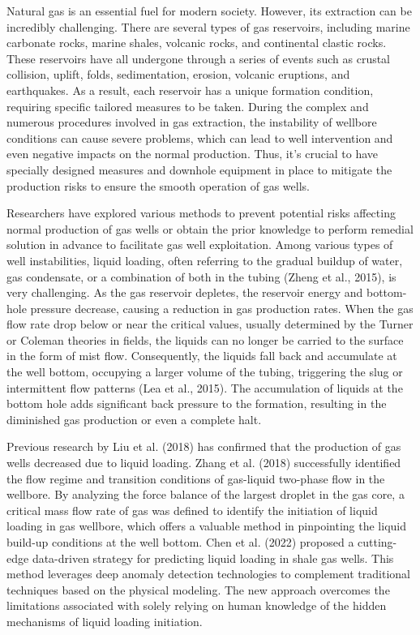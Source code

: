 \documentclass[sn-mathphys,Numbered]{sn-jnl}%
\theoremstyle{thmstyleone}%
\theoremstyle{thmstyletwo}%
\theoremstyle{thmstylethree}%
\begin{document}
Natural gas is an essential fuel for modern society. However, its extraction can be incredibly challenging. There are several types of gas reservoirs, including marine carbonate rocks, marine shales, volcanic rocks, and continental clastic rocks. These reservoirs have all undergone through a series of events such as crustal collision, uplift, folds, sedimentation, erosion, volcanic eruptions, and earthquakes. As a result, each reservoir has a unique formation condition, requiring specific tailored measures to be taken. During the complex and numerous procedures involved in gas extraction, the instability of wellbore conditions can cause severe problems, which can lead to well intervention and even negative impacts on the normal production. Thus, it's crucial to have specially designed measures and downhole equipment in place to mitigate the production risks to ensure the smooth operation of gas wells. 

Researchers have explored various methods to prevent potential risks affecting normal production of gas wells or obtain the prior knowledge to perform remedial solution in advance to facilitate gas well exploitation. Among various types of well instabilities, liquid loading, often referring to the gradual buildup of water, gas condensate, or a combination of both in the tubing (Zheng et al., 2015), is very challenging. As the gas reservoir depletes, the reservoir energy and bottom-hole pressure decrease, causing a reduction in gas production rates. When the gas flow rate drop below or near the critical values, usually determined by the Turner or Coleman theories in fields, the liquids can no longer be carried to the surface in the form of mist flow. Consequently, the liquids fall back and accumulate at the well bottom, occupying a larger volume of the tubing, triggering the slug or intermittent flow patterns (Lea et al., 2015). The accumulation of liquids at the bottom hole adds significant back pressure to the formation, resulting in the diminished gas production or even a complete halt.

Previous research by Liu et al. (2018) has confirmed that the production of gas wells decreased due to liquid loading. Zhang et al. (2018) successfully identified the flow regime and transition conditions of gas-liquid two-phase flow in the wellbore. By analyzing the force balance of the largest droplet in the gas core, a critical mass flow rate of gas was defined to identify the initiation of liquid loading in gas wellbore, which offers a valuable method in pinpointing the liquid build-up conditions at the well bottom. Chen et al. (2022) proposed a cutting-edge data-driven strategy for predicting liquid loading in shale gas wells. This method leverages deep anomaly detection technologies to complement traditional techniques based on the physical modeling. The new approach overcomes the limitations associated with solely relying on human knowledge of the hidden mechanisms of liquid loading initiation.
\end{document}
